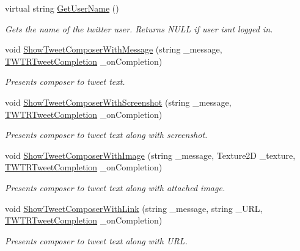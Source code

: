 \begin{DoxyCompactItemize}
virtual string \hyperlink{class_voxel_busters_1_1_native_plugins_1_1_twitter_a1e99e0a5863f109ff85a2f57a105505a}{Get\+User\+Name} ()
\begin{DoxyCompactList}\small\item\em Gets the name of the twitter user. Returns N\+U\+L\+L if user isnt logged in. \end{DoxyCompactList}\item 
void \hyperlink{class_voxel_busters_1_1_native_plugins_1_1_twitter_a79de75394508b2e9564b831a74e45f88}{Show\+Tweet\+Composer\+With\+Message} (string \+\_\+message, \hyperlink{class_voxel_busters_1_1_native_plugins_1_1_twitter_afc6b9ce57f190495125926ab9a0a2986}{T\+W\+T\+R\+Tweet\+Completion} \+\_\+on\+Completion)
\begin{DoxyCompactList}\small\item\em Presents composer to tweet text. \end{DoxyCompactList}\item 
void \hyperlink{class_voxel_busters_1_1_native_plugins_1_1_twitter_a48a128d7714f79e801e7a09b8edacf8e}{Show\+Tweet\+Composer\+With\+Screenshot} (string \+\_\+message, \hyperlink{class_voxel_busters_1_1_native_plugins_1_1_twitter_afc6b9ce57f190495125926ab9a0a2986}{T\+W\+T\+R\+Tweet\+Completion} \+\_\+on\+Completion)
\begin{DoxyCompactList}\small\item\em Presents composer to tweet text along with screenshot. \end{DoxyCompactList}\item 
void \hyperlink{class_voxel_busters_1_1_native_plugins_1_1_twitter_a7c85b7565e0f020adabee3ff7bb17308}{Show\+Tweet\+Composer\+With\+Image} (string \+\_\+message, Texture2\+D \+\_\+texture, \hyperlink{class_voxel_busters_1_1_native_plugins_1_1_twitter_afc6b9ce57f190495125926ab9a0a2986}{T\+W\+T\+R\+Tweet\+Completion} \+\_\+on\+Completion)
\begin{DoxyCompactList}\small\item\em Presents composer to tweet text along with attached image. \end{DoxyCompactList}\item 
void \hyperlink{class_voxel_busters_1_1_native_plugins_1_1_twitter_a302299a78c702ca3910f63f7afc2edfe}{Show\+Tweet\+Composer\+With\+Link} (string \+\_\+message, string \+\_\+\+U\+R\+L, \hyperlink{class_voxel_busters_1_1_native_plugins_1_1_twitter_afc6b9ce57f190495125926ab9a0a2986}{T\+W\+T\+R\+Tweet\+Completion} \+\_\+on\+Completion)
\begin{DoxyCompactList}\small\item\em Presents composer to tweet text along with U\+R\+L. \end{DoxyCompactList}\item 

\end{DoxyCompactItemize}
